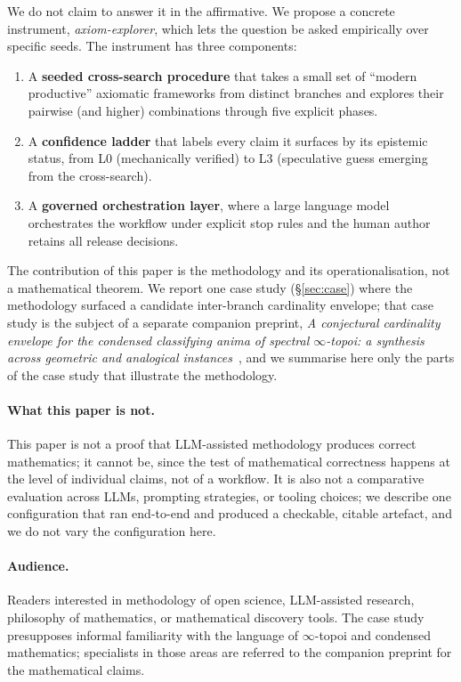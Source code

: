 \documentclass[11pt]{article}
\theoremstyle{definition}
\theoremstyle{remark}
\begin{document}
We do not claim to answer it in the affirmative. We propose a concrete
instrument, \emph{axiom-explorer}, which lets the question be asked
empirically over specific seeds. The instrument has three components:

\begin{enumerate}
\item A \textbf{seeded cross-search procedure} that takes a small set of
``modern productive'' axiomatic frameworks from distinct branches and
explores their pairwise (and higher) combinations through five explicit
phases.
\item A \textbf{confidence ladder} that labels every claim it surfaces by
its epistemic status, from L0 (mechanically verified) to L3 (speculative
guess emerging from the cross-search).
\item A \textbf{governed orchestration layer}, where a large language
model orchestrates the workflow under explicit stop rules and the human
author retains all release decisions.
\end{enumerate}

The contribution of this paper is the methodology and its
operationalisation, not a mathematical theorem. We report one case study
(\S\ref{sec:case}) where the methodology surfaced a candidate
inter-branch cardinality envelope; that case study is the subject of a
separate companion preprint, \emph{A conjectural cardinality envelope for
the condensed classifying anima of spectral $\infty$-topoi: a synthesis
across geometric and analogical instances}~\cite{Vera2026Conjecture}, and
we summarise here only the parts of the case study that illustrate the
methodology.

\paragraph{What this paper is not.} This paper is not a proof that
LLM-assisted methodology produces correct mathematics; it cannot be,
since the test of mathematical correctness happens at the level of
individual claims, not of a workflow. It is also not a comparative
evaluation across LLMs, prompting strategies, or tooling choices; we
describe one configuration that ran end-to-end and produced a
checkable, citable artefact, and we do not vary the configuration here.

\paragraph{Audience.} Readers interested in methodology of open
science, LLM-assisted research, philosophy of mathematics, or
mathematical discovery tools. The case study presupposes informal
familiarity with the language of $\infty$-topoi and condensed
mathematics; specialists in those areas are referred to the companion
preprint for the mathematical claims.
\end{document}
